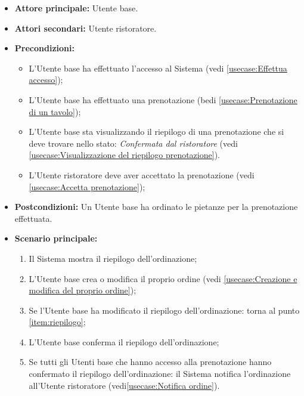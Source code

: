 \label{usecase:Ordinazione collaborativa dei pasti}
\begin{itemize}
	\item \textbf{Attore principale:} Utente base.

	\item \textbf{Attori secondari:} Utente ristoratore.

	\item \textbf{Precondizioni:}
		\begin{itemize}
			\item L'Utente base ha effettuato l'accesso al Sistema (vedi \autoref{usecase:Effettua accesso});
			\item L'Utente base ha effettuato una prenotazione (bedi \autoref{usecase:Prenotazione di un tavolo});
			\item L'Utente base sta visualizzando il riepilogo di una prenotazione che si deve trovare nello stato: \textit{Confermata dal ristoratore} (vedi \autoref{usecase:Visualizzazione del riepilogo prenotazione}).
			\item L'Utente ristoratore deve aver accettato la prenotazione (vedi \autoref{usecase:Accetta prenotazione});
		\end{itemize}
	      
	\item \textbf{Postcondizioni:} Un Utente base ha ordinato le pietanze per la prenotazione effettuata.

	\item \textbf{Scenario principale:}
	      \begin{enumerate}
		      \item \label{item:riepilogo}
		            Il Sistema mostra il riepilogo dell'ordinazione;

		      \item L'Utente base crea o modifica il proprio ordine
		            (vedi \autoref{usecase:Creazione e modifica del proprio ordine});

		      \item Se l'Utente base ha modificato il riepilogo dell'ordinazione: torna al punto \ref{item:riepilogo};

		      \item L'Utente base conferma il riepilogo dell'ordinazione;

		      \item Se tutti gli Utenti base che hanno accesso alla prenotazione
		            hanno confermato il riepilogo dell'ordinazione: il Sistema
		            notifica l'ordinazione all'Utente ristoratore (vedi\autoref{usecase:Notifica ordine}).
	      \end{enumerate}


\end{itemize}
